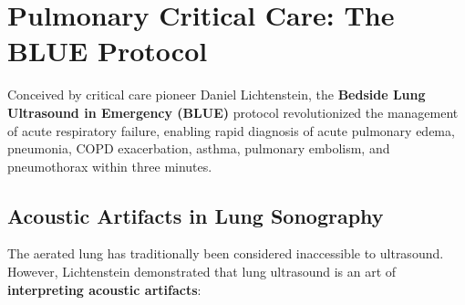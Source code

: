 \documentclass[11pt,a4paper]{article}
\begin{document}
\section{Pulmonary Critical Care: The BLUE Protocol}
Conceived by critical care pioneer Daniel Lichtenstein, the \textbf{Bedside Lung Ultrasound in Emergency (BLUE)} protocol revolutionized the management of acute respiratory failure, enabling rapid diagnosis of acute pulmonary edema, pneumonia, COPD exacerbation, asthma, pulmonary embolism, and pneumothorax within three minutes.

\subsection{Acoustic Artifacts in Lung Sonography}
The aerated lung has traditionally been considered inaccessible to ultrasound. However, Lichtenstein demonstrated that lung ultrasound is an art of \textbf{interpreting acoustic artifacts}:
\end{document}
